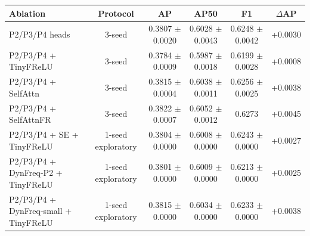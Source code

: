 \begin{tabular}{lccccc}
\toprule
Ablation & Protocol & AP & AP50 & F1 & $\Delta$AP \\
\midrule
P2/P3/P4 heads & 3-seed & 0.3807 $\pm$ 0.0020 & 0.6028 $\pm$ 0.0043 & 0.6248 $\pm$ 0.0042 & +0.0030 \\
P2/P3/P4 + TinyFReLU & 3-seed & 0.3784 $\pm$ 0.0009 & 0.5987 $\pm$ 0.0018 & 0.6199 $\pm$ 0.0028 & +0.0008 \\
P2/P3/P4 + SelfAttn & 3-seed & 0.3815 $\pm$ 0.0004 & 0.6038 $\pm$ 0.0011 & 0.6256 $\pm$ 0.0025 & +0.0038 \\
P2/P3/P4 + SelfAttnFR & 3-seed & 0.3822 $\pm$ 0.0007 & 0.6052 $\pm$ 0.0012 & 0.6273 & +0.0045 \\
P2/P3/P4 + SE + TinyFReLU & 1-seed exploratory & 0.3804 $\pm$ 0.0000 & 0.6008 $\pm$ 0.0000 & 0.6243 $\pm$ 0.0000 & +0.0027 \\
P2/P3/P4 + DynFreq-P2 + TinyFReLU & 1-seed exploratory & 0.3801 $\pm$ 0.0000 & 0.6009 $\pm$ 0.0000 & 0.6213 $\pm$ 0.0000 & +0.0025 \\
P2/P3/P4 + DynFreq-small + TinyFReLU & 1-seed exploratory & 0.3815 $\pm$ 0.0000 & 0.6034 $\pm$ 0.0000 & 0.6233 $\pm$ 0.0000 & +0.0038 \\
\bottomrule
\end{tabular}
